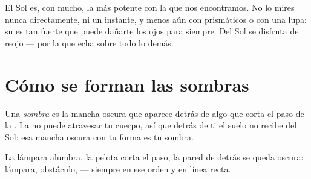 \begin{remark}\label{rem:g1:light-and-shadows:sun}
El Sol es, con mucho, la  más potente con la que nos
encontramos. No lo mires nunca directamente, ni un instante, y menos
aún con prismáticos o con una lupa: su  es tan fuerte que puede
dañarte los ojos para siempre. Del Sol se disfruta de reojo --- por la
 que echa sobre todo lo demás.
\end{remark}

\section{Cómo se forman las sombras}

\begin{definition}[Sombra]\label{def:g1:light-and-shadows:shadow}
Una \emph{sombra} es la mancha oscura que aparece detrás
de algo que corta el paso de la . La  no puede atravesar tu
cuerpo, así que detrás de ti el suelo no recibe  del Sol: esa
mancha oscura con tu forma es tu sombra.
\end{definition}

\begin{omfigure}

{\small La lámpara alumbra, la pelota corta el paso, la pared de
detrás se queda oscura: lámpara, obstáculo,  --- siempre en ese
orden y en línea recta.}
\end{omfigure}

